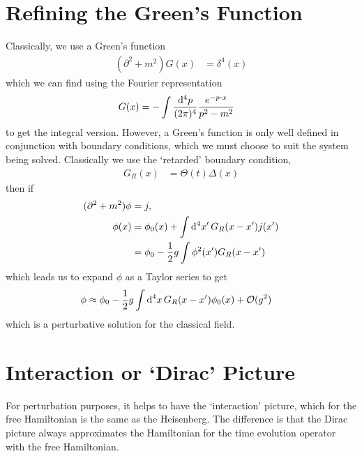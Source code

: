 \documentclass[notes.tex]{subfiles}
\begin{document}
\section{Refining the Green's Function}
Classically, we use a Green's function
\begin{align*}
	(\partial^2 + m^2)G(x) & = \delta^4(x)
\end{align*}
which we can find using the Fourier representation
\begin{align*}
	G(x) & = -\int\frac{\dd[4]{p}}{(2\pi)^4} \frac{e^{-p\vdot{x}}}{p^2 - m^2}
\end{align*}
to get the integral version.
However, a Green's function is only well defined in conjunction with boundary conditions, which we must choose to suit the system being solved.
Classically we use the `retarded' boundary condition,
\begin{align*}
	G_R(x) & = \Theta(t)\Delta(x)
\end{align*}
then if
\begin{align*}
	(\partial^2 + m^2)\phi & = j,                                                           \\
	\phi(x)                & = \phi_0(x) + \int \dd[4]{x^\prime} G_R(x-x^\prime)j(x^\prime) \\
	                       & = \phi_0 - \frac{1}{2} g\int\phi^2(x^\prime)G_R(x-x^\prime)
\end{align*}
which leads us to expand $\phi$ as a Taylor series to get
\begin{align*}
	\phi & \approx \phi_0 -\frac{1}{2} g \int\dd[4]{x} G_R(x-x^\prime) \phi_0(x) + \mathcal{O}(g^2)
\end{align*}
which is a perturbative solution for the classical field.

\section{Interaction or `Dirac' Picture}
For perturbation purposes, it helps to have the `interaction' picture, which for the free Hamiltonian is the same as the Heisenberg.
The difference is that the Dirac picture always approximates the Hamiltonian for the time evolution operator with the free Hamiltonian.
\end{document}
